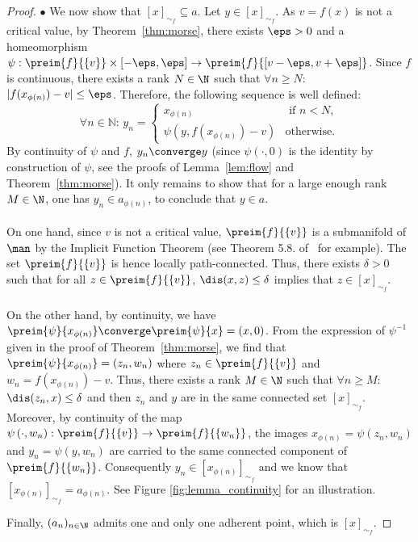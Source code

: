 \begin{proof}
$\bullet$ We now show that $[x]_{\sim_f}\subseteq a$. Let $y\in[x]_{\sim_f}$. As $v=f(x)$ is not a critical value, by Theorem~\ref{thm:morse}, there exists $\eps>0$ and a homeomorphism $\psi:\preim{f}{\{v\}}\times[-\eps,\eps] \rightarrow \preim{f}{[v-\eps,v+\eps]}$. 
Since $f$ is continuous, there exists a rank $N\in\N$ such that $\forall n\geq N$: $|f(x_{\phi(n)})-v|\leq \eps$. Therefore, the following sequence is well defined:
$$\forall n\in\mathbb{N}:\,y_n=\begin{cases}
    x_{\phi(n)}&\text{ if } n<N,\\
    \psi\left(y,f(x_{\phi(n)})-v\right)&\text{otherwise}.
\end{cases}$$
By continuity of $\psi$ and $f$, $y_n\converge y$ (since $\psi(\cdot,0)$ is the identity by construction of $\psi$, see the proofs of Lemma~\ref{lem:flow} and Theorem~\ref{thm:morse}). It only remains to show that for a large enough rank $M\in\N$, one has $y_n\in a_{\phi(n)}$,
to conclude that $y\in a$.\\\\
On one hand, since $v$ is not a critical value, $\preim{f}{\{v\}}$ is a submanifold of $\man$ by the Implicit Function Theorem (see Theorem 5.8. of~\cite{boothby1986introduction} for example). The set $\preim{f}{\{v\}}$ is hence locally path-connected. Thus, there exists $\delta>0$ such that for all  $z\in \preim{f}{\{v\}}$, $\dis(x,z)\leq\delta$ implies that $z\in[x]_{\sim_f}$.\\\\
On the other hand, by continuity, we have $\preim{\psi}{x_{\phi(n)}}\converge \preim{\psi}{x}=(x,0)$. From the expression of $\psi^{-1}$ given in the proof of Theorem~\ref{thm:morse}, we find that   $\preim{\psi}{x_{\phi(n)}}=\left(z_n,w_n\right)$ where $z_n \in \preim{f}{\{v\}}$ and  $w_n=f(x_{\phi(n)})-v$. Thus, there exists a rank $M\in\N$ such that $\forall n\geq M$: $\dis(z_n,x)\leq\delta$ and then 
 $z_n$ and $y$ are in the same connected set $[x]_{\sim_f}$. Moreover, by continuity of the map $\psi\left(\cdot,w_n\right) : \preim{f}{\{v\}} \rightarrow  \preim{f}{\{w_n\}}$, the images  $x_{\phi(n)} = \psi\left(z_n,w_n\right)$ and $y_n = \psi\left(y,w_n\right)$  are carried to the same connected component of $\preim{f}{\{w_n\}}$. Consequently $y_n\in[x_{\phi(n)}]_{\sim_f}$ and we know that $[x_{\phi(n)}]_{\sim_f}=a_{\phi(n)}$. See Figure \ref{fig:lemma_continuity} for an illustration.

Finally, $(a_n)_{n\in\N}$ admits one and only one adherent point, which is $[x]_{\sim_f}$.


\end{proof}
